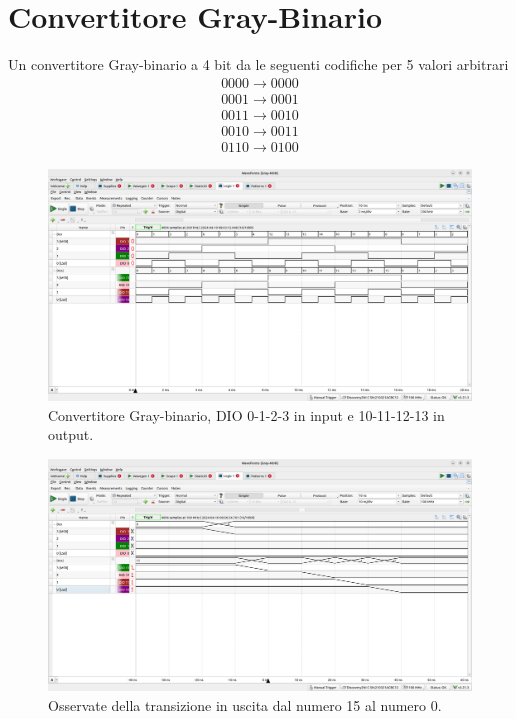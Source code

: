 \documentclass[10pt,a4paper]{article}
\begin{document}
\section*{Convertitore Gray-Binario}
Un convertitore Gray-binario a 4 bit da le seguenti codifiche per 5 valori arbitrari
\begin{align*}
    0000 \rightarrow 0000
\end{align*}
\begin{align*}
    0001 \rightarrow 0001
\end{align*}
\begin{align*}
    0011 \rightarrow 0010
\end{align*}
\begin{align*}
    0010 \rightarrow 0011
\end{align*}
\begin{align*}
    0110 \rightarrow 0100
\end{align*}

\begin{figure}[htp]
    \begin{center}
    \includegraphics[scale=0.25]{fig6.png}
    \caption{Convertitore Gray-binario, DIO 0-1-2-3 in input e 10-11-12-13 in output.}
    \label{fig6}
    \end{center}
\end{figure}

\begin{figure}[htp]
    \begin{center}
    \includegraphics[scale=0.25]{fig7.png}
    \caption{Osservate della transizione in uscita dal numero 15
    al numero 0.}
    \label{fig7}
    \end{center}
\end{figure}
\end{document}
